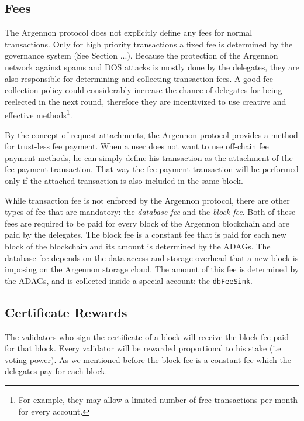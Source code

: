 
\subsection{Fees}\label{subsec:fees}

The Argennon protocol does not explicitly define any fees for normal transactions. Only for high priority
transactions a fixed fee is determined by the governance system (See Section ...). Because the protection of the
Argennon network against spams and DOS attacks is mostly done by the delegates, they are also responsible for
determining and collecting transaction fees. A good fee collection policy could considerably increase the chance of
delegates for being reelected in the next round, therefore they are incentivized to use creative and effective
methods\footnote{For example, they may
allow a limited number of free transactions per month for every account.}.

By the concept of request attachments, the Argennon protocol provides a method
for trust-less fee payment. When a user does not want to use off-chain fee payment methods, he can simply define his
transaction as the attachment
of the fee payment transaction. That way the fee payment transaction will be performed only if the attached
transaction is also included in the same block.

While transaction fee is not enforced by the Argennon protocol, there are other types of fee that are mandatory: the
\emph{database fee} and the \emph{block fee}. Both of these fees are required to be paid for every block of the Argennon
blockchain and are paid by the delegates. The block fee is a constant fee that is paid for each new block of the
blockchain and its amount is
determined by the ADAGs. The database fee depends on the data access and storage overhead that a new block
is imposing on the Argennon storage cloud. The amount of this fee is determined by the ADAGs, and is collected inside
a special account: the \texttt{dbFeeSink}.

\subsection{Certificate Rewards}\label{subsec:rewards}

The validators who sign the certificate of a block will receive the block fee paid for that block. Every validator
will be rewarded
proportional to his stake (i.e voting power). As we mentioned before the block fee is a constant fee which the
delegates pay for each block.

